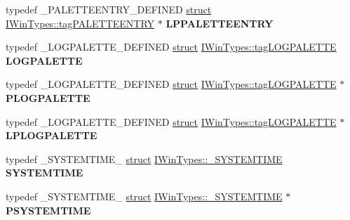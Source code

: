 \begin{DoxyCompactItemize}
\mbox{\label{interface_i_win_types_ac6a337186bb2f44ffa036410fe8de4e3}} 
typedef \+\_\+\+P\+A\+L\+E\+T\+T\+E\+E\+N\+T\+R\+Y\+\_\+\+D\+E\+F\+I\+N\+ED \hyperlink{interfacestruct}{struct} \hyperlink{struct_i_win_types_1_1tag_p_a_l_e_t_t_e_e_n_t_r_y}{I\+Win\+Types\+::tag\+P\+A\+L\+E\+T\+T\+E\+E\+N\+T\+RY} $\ast$ {\bfseries L\+P\+P\+A\+L\+E\+T\+T\+E\+E\+N\+T\+RY}
\item 
\mbox{\label{interface_i_win_types_ad57d91f1d1a11828ec1c751d57cc417f}} 
typedef \+\_\+\+L\+O\+G\+P\+A\+L\+E\+T\+T\+E\+\_\+\+D\+E\+F\+I\+N\+ED \hyperlink{interfacestruct}{struct} \hyperlink{struct_i_win_types_1_1tag_l_o_g_p_a_l_e_t_t_e}{I\+Win\+Types\+::tag\+L\+O\+G\+P\+A\+L\+E\+T\+TE} {\bfseries L\+O\+G\+P\+A\+L\+E\+T\+TE}
\item 
\mbox{\label{interface_i_win_types_a3c9018fc647335c1b92ad1502210a443}} 
typedef \+\_\+\+L\+O\+G\+P\+A\+L\+E\+T\+T\+E\+\_\+\+D\+E\+F\+I\+N\+ED \hyperlink{interfacestruct}{struct} \hyperlink{struct_i_win_types_1_1tag_l_o_g_p_a_l_e_t_t_e}{I\+Win\+Types\+::tag\+L\+O\+G\+P\+A\+L\+E\+T\+TE} $\ast$ {\bfseries P\+L\+O\+G\+P\+A\+L\+E\+T\+TE}
\item 
\mbox{\label{interface_i_win_types_aa2e5994942c4a1c215d9b01f18484951}} 
typedef \+\_\+\+L\+O\+G\+P\+A\+L\+E\+T\+T\+E\+\_\+\+D\+E\+F\+I\+N\+ED \hyperlink{interfacestruct}{struct} \hyperlink{struct_i_win_types_1_1tag_l_o_g_p_a_l_e_t_t_e}{I\+Win\+Types\+::tag\+L\+O\+G\+P\+A\+L\+E\+T\+TE} $\ast$ {\bfseries L\+P\+L\+O\+G\+P\+A\+L\+E\+T\+TE}
\item 
\mbox{\label{interface_i_win_types_a35fbf7a02aa63dd739eabc82cb9870f2}} 
typedef \+\_\+\+S\+Y\+S\+T\+E\+M\+T\+I\+M\+E\+\_\+ \hyperlink{interfacestruct}{struct} \hyperlink{struct_i_win_types_1_1___s_y_s_t_e_m_t_i_m_e}{I\+Win\+Types\+::\+\_\+\+S\+Y\+S\+T\+E\+M\+T\+I\+ME} {\bfseries S\+Y\+S\+T\+E\+M\+T\+I\+ME}
\item 
\mbox{\label{interface_i_win_types_aa096ee3ea25bc5aa38b156231127eb20}} 
typedef \+\_\+\+S\+Y\+S\+T\+E\+M\+T\+I\+M\+E\+\_\+ \hyperlink{interfacestruct}{struct} \hyperlink{struct_i_win_types_1_1___s_y_s_t_e_m_t_i_m_e}{I\+Win\+Types\+::\+\_\+\+S\+Y\+S\+T\+E\+M\+T\+I\+ME} $\ast$ {\bfseries P\+S\+Y\+S\+T\+E\+M\+T\+I\+ME}

\end{DoxyCompactItemize}
